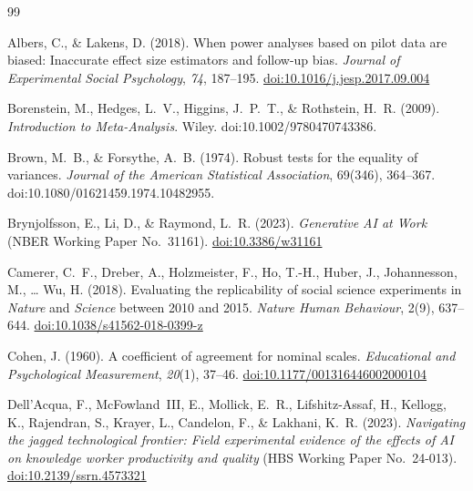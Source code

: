 \documentclass[12pt,a4paper]{article}
\begin{document}
\begin{thebibliography}{99}

Albers, C., \& Lakens, D. (2018).
When power analyses based on pilot data are biased: Inaccurate effect size
  estimators and follow-up bias.
\textit{Journal of Experimental Social Psychology}, \textit{74}, 187--195.
\href{https://doi.org/10.1016/j.jesp.2017.09.004}{doi:10.1016/j.jesp.2017.09.004}

Borenstein, M., Hedges, L.~V., Higgins, J.~P.~T., \& Rothstein, H.~R. (2009).
\emph{Introduction to Meta-Analysis}. Wiley.
doi:10.1002/9780470743386.

Brown, M.~B., \& Forsythe, A.~B. (1974). Robust tests for the equality of
variances. \emph{Journal of the American Statistical Association}, 69(346),
364--367. doi:10.1080/01621459.1974.10482955.

Brynjolfsson, E., Li, D., \& Raymond, L.~R. (2023).
\textit{Generative AI at Work} (NBER Working Paper No.~31161).
\href{https://doi.org/10.3386/w31161}{doi:10.3386/w31161}

Camerer, C.~F., Dreber, A., Holzmeister, F., Ho, T.-H., Huber, J.,
Johannesson, M., \ldots{} Wu, H. (2018).
Evaluating the replicability of social science experiments in
\textit{Nature} and \textit{Science} between 2010 and 2015.
\textit{Nature Human Behaviour}, 2(9), 637--644.
\href{https://doi.org/10.1038/s41562-018-0399-z}{doi:10.1038/s41562-018-0399-z}

Cohen, J. (1960).
A coefficient of agreement for nominal scales.
\textit{Educational and Psychological Measurement}, \textit{20}(1), 37--46.
\href{https://doi.org/10.1177/001316446002000104}{doi:10.1177/001316446002000104}

Dell'Acqua, F., McFowland~III, E., Mollick, E.~R., Lifshitz-Assaf, H.,
  Kellogg, K., Rajendran, S., Krayer, L., Candelon, F., \& Lakhani, K.~R.
  (2023).
\textit{Navigating the jagged technological frontier: Field experimental
  evidence of the effects of AI on knowledge worker productivity and quality}
  (HBS Working Paper No.~24-013).
\href{https://doi.org/10.2139/ssrn.4573321}{doi:10.2139/ssrn.4573321}


\end{thebibliography}
\end{document}
